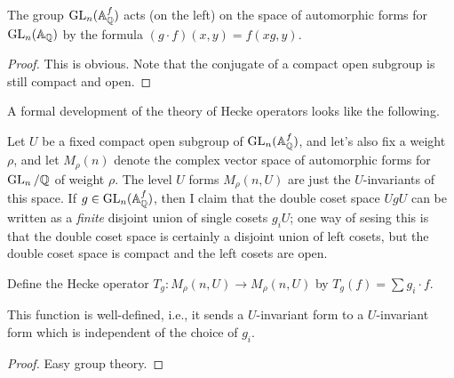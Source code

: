\begin{lemma} The group $\operatorname{GL}_n(\mathbb{A}_{\mathbb{Q}}^f)$ acts (on the left) on the space of automorphic forms
  for $\operatorname{GL}_n(\mathbb{A}_{\mathbb{Q}})$ by the formula $(g\cdot f)(x,y)=f(xg,y)$.
\end{lemma}
\begin{proof}
  This is obvious. Note that the conjugate of a compact open subgroup is still
  compact and open.
\end{proof}

A formal development of the theory of Hecke operators looks like the following.

Let $U$ be a fixed compact open subgroup of $\operatorname{GL}_n(\mathbb{A}_{\mathbb{Q}}^f)$, and let's also fix
a weight $\rho$, and let $M_\rho(n)$ denote the complex vector space of automorphic
forms for $\operatorname{GL}_n/\mathbb{Q}$ of weight $\rho$. The level $U$ forms $M_\rho(n,U)$ are just the $U$-invariants
of this space. If $g\in\operatorname{GL}_n(\mathbb{A}_{\mathbb{Q}}^f)$, then I
claim that the double coset space $UgU$ can be written as a \emph{finite} disjoint union
of single cosets $g_iU$; one way of sesing this is that the double coset space is certainly
a disjoint union of left cosets, but the double coset space is compact and the left cosets
are open.

Define the Hecke operator $T_g:M_\rho(n,U)\to M_\rho(n,U)$ by
$T_g(f)=\sum g_i\cdot f$.

\begin{lemma} This function is well-defined, i.e., it sends a $U$-invariant form to
  a $U$-invariant form which is independent of the choice of $g_i$.
\end{lemma}
\begin{proof} Easy group theory.
\end{proof}
